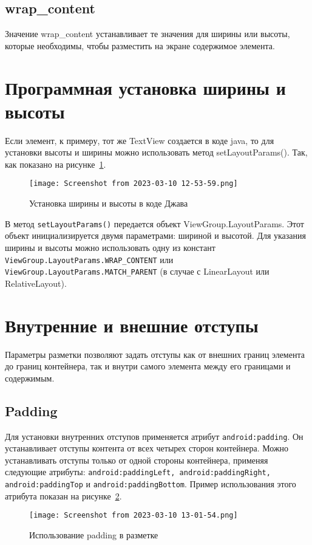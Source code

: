 \subsection{wrap\_content}
Значение wrap\_content устанавливает те значения для ширины или высоты,
которые необходимы, чтобы разместить на экране содержимое элемента.

\section{Программная установка ширины и высоты}
Если элемент, к примеру, тот же TextView создается в коде java, то для
установки высоты и ширины можно использовать метод setLayoutParams().
Так, как показано на рисунке~\ref{fig:java:set_hw}.

\begin{figure}[h!tp]
	\centering
	\texttt{[image: Screenshot from 2023-03-10 12-53-59.png]}
	\caption{Установка ширины и высоты в коде Джава}
	\label{fig:java:set_hw}
\end{figure}

В метод \texttt{setLayoutParams()} передается объект ViewGroup.LayoutParams.
Этот объект инициализируется двумя параметрами: шириной и высотой.
Для указания ширины и высоты можно использовать одну из констант
\texttt{ViewGroup.LayoutParams.WRAP\_CONTENT} или
\texttt{ViewGroup.LayoutParams.MATCH\_PARENT} (в случае с LinearLayout или
RelativeLayout).

\section{Внутренние и внешние отступы}
Параметры разметки позволяют задать отступы как от внешних границ
элемента до границ контейнера, так и внутри самого элемента между его
границами и содержимым.

\subsection{Padding}
Для установки внутренних отступов применяется атрибут
\texttt{android:padding}. Он устанавливает отступы контента от всех четырех
сторон контейнера. Можно устанавливать отступы только от одной стороны
контейнера, применяя следующие атрибуты:
\texttt{android:paddingLeft, android:paddingRight,
android:paddingTop} и \texttt{android:paddingBottom}.
Пример использования этого атрибута показан на рисунке~\ref{fig:xml:padding}.

\begin{figure}[h!tp]
	\centering
	\texttt{[image: Screenshot from 2023-03-10 13-01-54.png]}
	\caption{Использование padding в разметке}
	\label{fig:xml:padding}
\end{figure}

